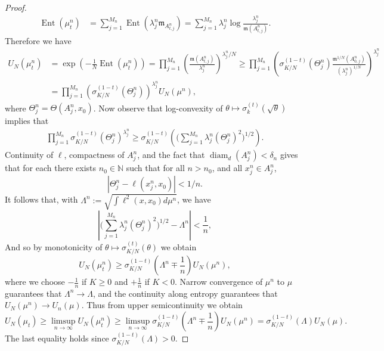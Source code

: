 \documentclass[10pt,a4paper]{amsart}
\DeclareMathOperator{\Ent}{Ent}
\DeclareMathOperator{\diam}{diam}
\newcommand{\N}{\mathbb{N}}
\newcommand{\m}{\mathfrak{m}}
\begin{document}
\begin{proof}
\begin{align*}
\Ent(\mu_t^n) &= \sum_{j=1}^{M_n}\Ent(\lambda_j^n\m_{A_{t,j}^n}) = \sum_{j=1}^{M_n} \lambda_j^n\log\frac{\lambda_j^n}{\m(A_{t,j}^n)}.
\end{align*}
Therefore we have 
\begin{align*}
U_N(\mu_t^n) &=\exp\left(-\frac1N\Ent(\mu_t^n)\right) =\prod_{j=1}^{M_n} \left(\frac{\m(A_{t,j}^n)}{\lambda_j^n}\right)^{\lambda_j^n/N} \geq \prod_{j=1}^{M_n}\left(\sigma_{K/N}^{(1-t)}(\Theta_j^n)\frac{\m^{1/N}(A_{0,j}^n)}{(\lambda_j^n)^{1/N}}\right)^{\lambda_j^n } \\
&= \prod_{j=1}^{M_n}\left(\sigma_{K/N}^{(1-t)}(\Theta_j^n)\right)^{\lambda_j^n} U_N(\mu^n),
\end{align*}
where $\Theta_j^n=\Theta(A_j^n,x_0)$. Now observe that log-convexity of $\theta\mapsto \sigma_{k}^{(t)}(\sqrt \theta)$ implies that 
\begin{align}\label{distortionestimate1}
\prod_{j=1}^{M_n} \sigma_{K/N}^{(1-t)}(\Theta_j^n)^{\lambda_j^n}\geq \sigma_{K/N}^{(1-t)}\left(\Big(\sum_{j=1}^{M_n} \lambda_j^n (\Theta_j^n)^2\Big)^{1/2}\right).
\end{align}
Continuity of $\ell$, compactness of $A_j^n$, and the fact that $\diam_d(A_j^n)<\delta_n$ gives that for each there exists $n_0\in\N$ such that for all $n>n_0$, and all $x_j^n\in A_j^n$, 
\[|\Theta_j^n-\ell(x_j^n,x_0)|<1/n.\]
It follows that, with $\Lambda^n:= \sqrt{\int \ell^2(x,x_0)d\mu^n}$, we have 
\[\left| \Big(\sum_{j=1}^{M_n} \lambda_j^n (\Theta_j^n)^2\Big)^{1/2}-\Lambda^n\right|<\frac 1n,\]
And so by monotonicity of $\theta\mapsto \sigma_{K/N}^{(t)}(\theta)$ we obtain 
\[U_N(\mu_t^n) \geq \sigma_{K/N}^{(1-t)}\left(\Lambda^n\mp \frac 1n\right)U_N(\mu^n), \]
where we choose $-\frac 1n$ if $K\geq 0$ and $+\frac 1n$ if $K<0$. Narrow convergence of $\mu^n$ to $\mu$ guarantees that $\Lambda^n\to \Lambda$, and the continuity along entropy guarantees that $U_N(\mu^n)\to U_n(\mu)$. Thus from upper semicontinuity we obtain
\[U_N(\mu_t)\geq \limsup_{n\to\infty} U_N(\mu_t^n) \geq \limsup_{n\to\infty}\sigma_{K/N}^{(1-t)}\left(\Lambda^n\mp \frac1n\right)U_N(\mu^n)= \sigma_{K/N}^{(1-t)}(\Lambda)U_N(\mu).\]
The last equality holds since $\sigma_{K/N}^{(1-t)}(\Lambda)>0$. 

\end{proof}
\end{document}
